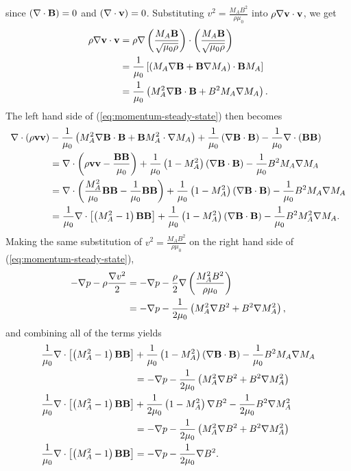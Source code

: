 since $\left( \nabla \cdot\mathbf{B} \right)=0$ and $\left( \nabla \cdot\mathbf{v} \right)=0$. Substituting $v^2 = \frac{M_A B^2}{\rho\mu_0}$ into $\rho\nabla\mathbf{v}\cdot\mathbf{v}$, we get
\[\begin{split}
    \rho\nabla\mathbf{v}\cdot\mathbf{v} &= \rho\nabla\left( \frac{M_A \mathbf{B}}{\sqrt{\mu_0\rho}} \right)\cdot\left( \frac{M_A \mathbf{B}}{\sqrt{\mu_0\rho}} \right) \\
    &= \frac{1}{\mu_0}\left[ \left( M_A\nabla\mathbf{B} + \mathbf{B}\nabla M_A \right)\cdot\mathbf{B} M_A \right] \\
    &= \frac{1}{\mu_0}\left( M_A^2\nabla\mathbf{B}\cdot\mathbf{B} + B^2 M_A\nabla M_A \right). \\
\end{split}\]
The left hand side of (\ref{eq:momentum-steady-state}) then becomes
\[\begin{split}
    \nabla \cdot\left( \rho\mathbf{v}\mathbf{v} \right) &- \frac{1}{\mu_0}\left( M_A^2\nabla\mathbf{B}\cdot\mathbf{B} + \mathbf{B} M_A^2\cdot\nabla M_A \right) + \frac{1}{\mu_0}\left( \nabla\mathbf{B}\cdot\mathbf{B} \right) - \frac{1}{\mu_0}\nabla \cdot\left( \mathbf{B}\mathbf{B} \right) \\
    &= \nabla \cdot\left( \rho\mathbf{v}\mathbf{v} - \frac{\mathbf{B}\mathbf{B}}{\mu_0} \right) + \frac{1}{\mu_0}\left( 1-M_A^2 \right)\left( \nabla\mathbf{B}\cdot\mathbf{B} \right) - \frac{1}{\mu_0}B^2 M_A\nabla M_A \\
    &= \nabla \cdot\left( \frac{M_A^2}{\mu_0}\mathbf{B}\mathbf{B} - \frac{1}{\mu_0}\mathbf{B}\mathbf{B} \right) + \frac{1}{\mu_0}\left( 1-M_A^2 \right)\left( \nabla\mathbf{B}\cdot\mathbf{B} \right) - \frac{1}{\mu_0}B^2M_A\nabla M_A \\
    &= \frac{1}{\mu_0}\nabla \cdot\left[ \left( M_A^2-1 \right)\mathbf{B}\mathbf{B} \right] + \frac{1}{\mu_0}\left( 1-M_A^2 \right)\left( \nabla\mathbf{B}\cdot\mathbf{B} \right) - \frac{1}{\mu_0}B^2 M_A^2\nabla M_A. \\
\end{split}\]
Making the same substitution of $v^2 = \frac{M_A B^2}{\rho\mu_0}$ on the right hand side of (\ref{eq:momentum-steady-state}),
\[\begin{split}
    -\nabla p -\rho\frac{\nabla v^2}{2} &= -\nabla p -\frac{\rho}{2}\nabla\left( \frac{M_A^2 B^2}{\rho\mu_0} \right) \\
    &= -\nabla p - \frac{1}{2\mu_0}\left( M_A^2 \nabla B^2 + B^2\nabla M_A^2 \right), \\
\end{split}\]
and combining all of the terms yields
\[\begin{split}
    \frac{1}{\mu_0}\nabla \cdot\left[ \left( M_A^2-1 \right)\mathbf{B}\mathbf{B} \right] &+ \frac{1}{\mu_0}\left( 1-M_A^2 \right)\left( \nabla\mathbf{B}\cdot\mathbf{B} \right) - \frac{1}{\mu_0}B^2 M_A\nabla M_A \\
    &= -\nabla p - \frac{1}{2\mu_0}\left( M_A^2 \nabla B^2 + B^2\nabla M_A^2 \right) \\
    \frac{1}{\mu_0}\nabla \cdot\left[ \left( M_A^2-1 \right)\mathbf{B}\mathbf{B} \right] &+ \frac{1}{2\mu_0}\left( 1-M_A^2 \right)\nabla B^2 - \frac{1}{2\mu_0}B^2\nabla M_A^2 \\
    &= -\nabla p - \frac{1}{2\mu_0}\left( M_A^2 \nabla B^2 + B^2\nabla M_A^2 \right) \\
    \frac{1}{\mu_0}\nabla \cdot\left[ \left( M_A^2-1 \right)\mathbf{B}\mathbf{B} \right] &= - \nabla p -\frac{1}{2\mu_0}\nabla B^2. \\
\end{split}\]
